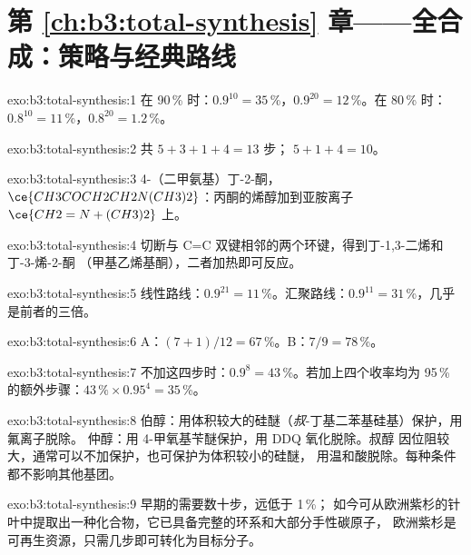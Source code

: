 \section*{第 \ref{ch:b3:total-synthesis} 章——全合成：策略与经典路线}

\begin{solution}{exo:b3:total-synthesis:1}
在 90\,\% 时：$0.9^{10} = 35$\,\%，$0.9^{20} = 12$\,\%。在 80\,\% 时：$0.8^{10} = 11$\,\%，$0.8^{20} = 1.2$\,\%。
\end{solution}

\begin{solution}{exo:b3:total-synthesis:2}
共 $5 + 3 + 1 + 4 = 13$ 步； $5 + 1 + 4 = 10$。
\end{solution}

\begin{solution}{exo:b3:total-synthesis:3}
4-（二甲氨基）丁-2-酮，$\ce{CH3COCH2CH2N(CH3)2}$：丙酮的烯醇加到亚胺离子
$\ce{CH2=N+(CH3)2}$ 上。
\end{solution}

\begin{solution}{exo:b3:total-synthesis:4}
切断与 C=C 双键相邻的两个环键，得到丁-1,3-二烯和丁-3-烯-2-酮
（甲基乙烯基酮），二者加热即可反应。
\end{solution}

\begin{solution}{exo:b3:total-synthesis:5}
线性路线：$0.9^{21} = 11$\,\%。汇聚路线：$0.9^{11} = 31$\,\%，几乎是前者的三倍。
\end{solution}

\begin{solution}{exo:b3:total-synthesis:6}
A：$(7 + 1)/12 = 67$\,\%。B：$7/9 = 78$\,\%。
\end{solution}

\begin{solution}{exo:b3:total-synthesis:7}
不加这四步时：$0.9^8 = 43$\,\%。若加上四个收率均为 95\,\% 的额外步骤：$43\,\% \times 0.95^4 = 35$\,\%。
\end{solution}

\begin{solution}{exo:b3:total-synthesis:8}
伯醇：用体积较大的硅醚（\textit{叔}-丁基二苯基硅基）保护，用氟离子脱除。
仲醇：用 4-甲氧基苄醚保护，用 DDQ 氧化脱除。叔醇
因位阻较大，通常可以不加保护，也可保护为体积较小的硅醚，
用温和酸脱除。每种条件都不影响其他基团。
\end{solution}

\begin{solution}{exo:b3:total-synthesis:9}
早期的需要数十步，远低于 1\,\%；
如今可从欧洲紫杉的针叶中提取出一种化合物，它已具备完整的环系和大部分手性碳原子，
欧洲紫杉是可再生资源，只需几步即可转化为目标分子。
\end{solution}

